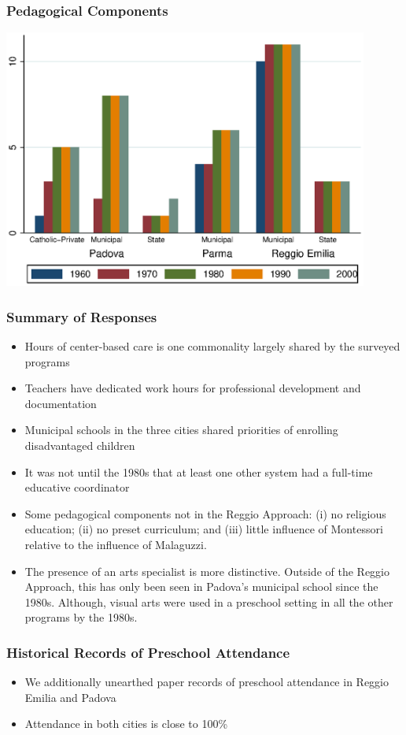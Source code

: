 \documentclass[dynamic]{JJH-Beamer}
\begin{document}
\begin{frame}
\frametitle{Pedagogical Components}
\includegraphics[width=0.9\textwidth]{../../output/aggregatePedagogical.eps}
\end{frame}


\begin{frame}
\frametitle{Summary of Responses}
\footnotesize
\begin{itemize}
	\item Hours of center-based care is one commonality largely shared by the surveyed programs
	\item  Teachers have dedicated work hours for professional development and documentation
	\item Municipal schools in the three cities shared priorities of enrolling disadvantaged children
	\item It was not until the 1980s that at least one other system had a full-time educative coordinator
	\item Some pedagogical components not in the Reggio Approach: (i) no religious education; (ii) no preset curriculum; and (iii) little influence of Montessori relative to the influence of Malaguzzi. 
	\item The presence of an arts specialist is more distinctive. Outside of the Reggio Approach, this has only been seen in Padova's municipal school since the 1980s. Although, visual arts were used in a preschool setting in all the other programs by the 1980s.  
\end{itemize}
\end{frame}

\begin{frame}
\frametitle{Historical Records of Preschool Attendance}
\begin{itemize}
	\item We additionally unearthed paper records of preschool attendance in Reggio Emilia and Padova
	\item Attendance in both cities is close to 100\% 
\end{itemize}
\end{frame}
\end{document}
